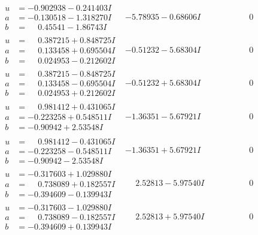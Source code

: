 \documentclass[1p]{elsarticle_modified}
\theoremstyle{definition}
\begin{document}
$$\begin{array}{c|c|c}
\begin{aligned}
u &= -0.902938 - 0.241403 I \\
a &= -0.130518 - 1.318270 I \\
b &= \phantom{-}0.45541 - 1.86743 I\end{aligned}
 & -5.78935 - 0.68606 I & \phantom{-0.000000 } 0 \\ \hline\begin{aligned}
u &= \phantom{-}0.387215 + 0.848725 I \\
a &= \phantom{-}0.133458 + 0.695504 I \\
b &= \phantom{-}0.024953 - 0.212602 I\end{aligned}
 & -0.51232 - 5.68304 I & \phantom{-0.000000 } 0 \\ \hline\begin{aligned}
u &= \phantom{-}0.387215 - 0.848725 I \\
a &= \phantom{-}0.133458 - 0.695504 I \\
b &= \phantom{-}0.024953 + 0.212602 I\end{aligned}
 & -0.51232 + 5.68304 I & \phantom{-0.000000 } 0 \\ \hline\begin{aligned}
u &= \phantom{-}0.981412 + 0.431065 I \\
a &= -0.223258 + 0.548511 I \\
b &= -0.90942 + 2.53548 I\end{aligned}
 & -1.36351 - 5.67921 I & \phantom{-0.000000 } 0 \\ \hline\begin{aligned}
u &= \phantom{-}0.981412 - 0.431065 I \\
a &= -0.223258 - 0.548511 I \\
b &= -0.90942 - 2.53548 I\end{aligned}
 & -1.36351 + 5.67921 I & \phantom{-0.000000 } 0 \\ \hline\begin{aligned}
u &= -0.317603 + 1.029880 I \\
a &= \phantom{-}0.738089 + 0.182557 I \\
b &= -0.394609 - 0.139943 I\end{aligned}
 & \phantom{-}2.52813 - 5.97540 I & \phantom{-0.000000 } 0 \\ \hline\begin{aligned}
u &= -0.317603 - 1.029880 I \\
a &= \phantom{-}0.738089 - 0.182557 I \\
b &= -0.394609 + 0.139943 I\end{aligned}
 & \phantom{-}2.52813 + 5.97540 I & \phantom{-0.000000 } 0\\

\end{array}$$
\end{document}
